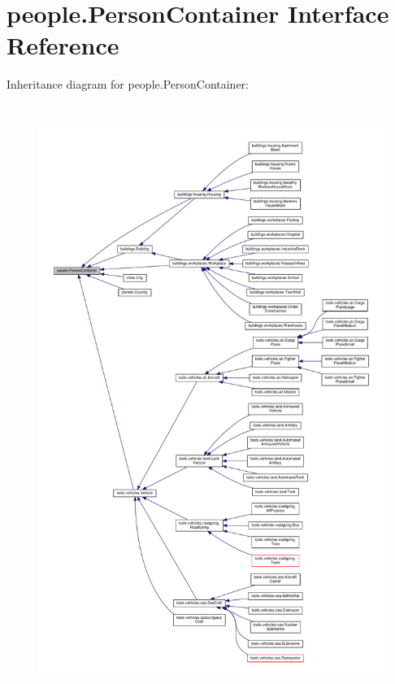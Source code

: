 \hypertarget{interfacepeople_1_1_person_container}{}\section{people.\+Person\+Container Interface Reference}
\label{interfacepeople_1_1_person_container}


Inheritance diagram for people.\+Person\+Container\+:\nopagebreak
\begin{figure}[H]
\begin{center}
\leavevmode
\includegraphics[height=550pt]{interfacepeople_1_1_person_container__inherit__graph}
\end{center}
\end{figure}
